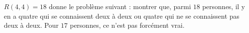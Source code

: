 $R(4, 4) = 18$ donne le problème suivant : montrer que, parmi $18$ personnes, il y en a quatre qui se connaissent deux à deux ou quatre qui ne se connaissent pas deux à deux. Pour $17$ personnes, ce n'est pas forcément vrai.
